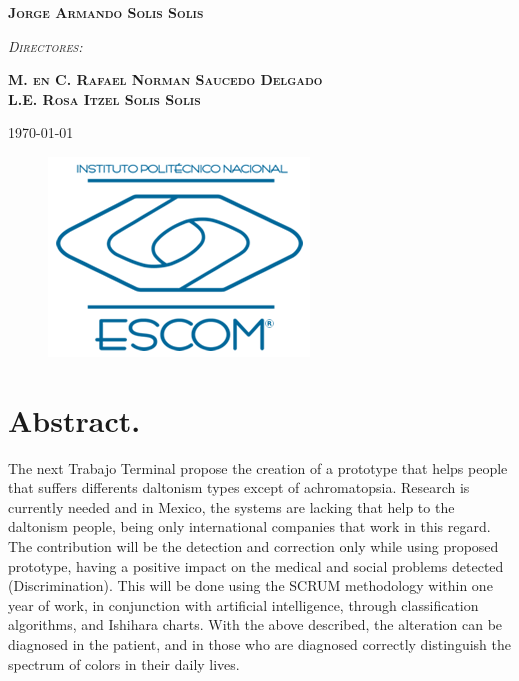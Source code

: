 \documentclass[10pt]{article}
\begin{document}
\begin{center}
\textsc{\Large \bfseries Jorge Armando Solis Solis }\\[2.00cm]
								

\begin{center}
\textsc{\Large \itshape Directores:}\\[0.4cm]
\end{center}

\textsc{\Large \bfseries
M. en C. Rafael Norman Saucedo Delgado \\
L.E. Rosa Itzel Solis Solis  }\\[2.00cm]

\end{center}							 											

\begin{minipage}{1.00\textwidth} \begin{flushright}
\textsc{\normalsize \today}\\[0.4cm]
\end{flushright}\end{minipage}


\begin{figure}[b]
\raggedright
\includegraphics[scale = 0.25]{Imagenes/logo.png}
\end{figure}

																				
\newpage																		

\section{Abstract.}
The next Trabajo Terminal propose the creation of a prototype that helps people that suffers differents daltonism types except of achromatopsia. Research is currently needed and in Mexico, the systems are lacking that help to the daltonism people, being only international companies that work in this regard. The contribution will be the detection and correction only while using proposed prototype, having a positive impact on the medical and social problems detected (Discrimination). This will be done using the SCRUM methodology within one year of work, in conjunction with artificial intelligence, through classification algorithms, and Ishihara charts. With the above described, the alteration can be diagnosed in the patient, and in those who are diagnosed correctly distinguish the spectrum of colors in their daily lives.
\end{document}
